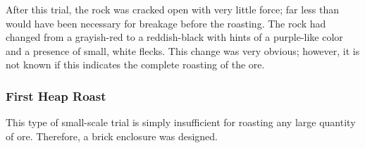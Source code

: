 After this trial, the rock was cracked open with very little force; far less
than would have been necessary for breakage before the roasting.  The rock had
changed from a grayish-red to a reddish-black with hints of a purple-like color
and a presence of small, white flecks.  This change was very obvious; however,
it is not known if this indicates the complete roasting of the ore.

\subsubsection{First Heap Roast}

This type of small-scale trial is simply insufficient for roasting any large
quantity of ore.  Therefore, a brick enclosure was designed.
